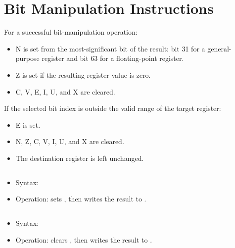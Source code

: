 \section{Bit Manipulation Instructions}

For a successful bit-manipulation operation:

\begin{itemize}
\item N is set from the most-significant bit of the result: bit 31 for a
      general-purpose register and bit 63 for a floating-point register.
\item Z is set if the resulting register value is zero.
\item C, V, E, I, U, and X are cleared.
\end{itemize}

If the selected bit index is outside the valid range of the target register:

\begin{itemize}
\item E is set.
\item N, Z, C, V, I, U, and X are cleared.
\item The destination register is left unchanged.
\end{itemize}

\subsection{}

\begin{itemize}
\item Syntax: 
\item Operation: sets , then writes the result to .
\end{itemize}

\subsection{}

\begin{itemize}
\item Syntax: 
\item Operation: clears , then writes the result to .
\end{itemize}

\subsection{}

